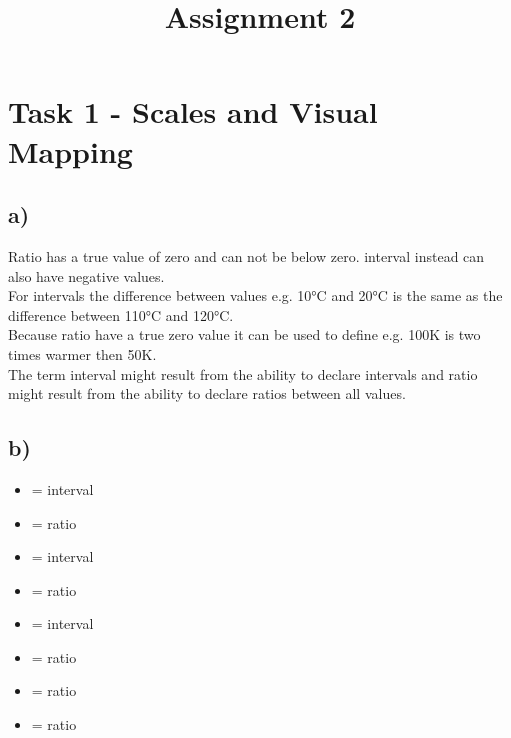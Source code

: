 \documentclass[a4paper]{article}
\date{}
\author{}
\title{Assignment 2}
\begin{document}
	\maketitle 
	\thispagestyle{fancy}
	
	\section*{Task 1 - Scales and Visual Mapping}
	\subsection*{a)}
	Ratio has a true value of zero and can not be below zero. interval instead can also have negative values.\\
	For intervals the difference between values e.g. 10°C and 20°C is the same as the difference between 110°C and 120°C.\\
	Because ratio have a true zero value it can be used to define e.g. 100K is two times warmer then 50K.\\
	The term interval might result from the ability to declare intervals and ratio might
result from the ability to declare ratios between all values.
	\subsection*{b)}
	\begin{itemize}
		\item{ = interval}
		\item{ = ratio}
		\item{ = interval}
		\item{ = ratio}
		\item{ = interval}
		\item{ = ratio}
		\item{ = ratio}
		\item{ = ratio}
	\end{itemize}
\end{document}
